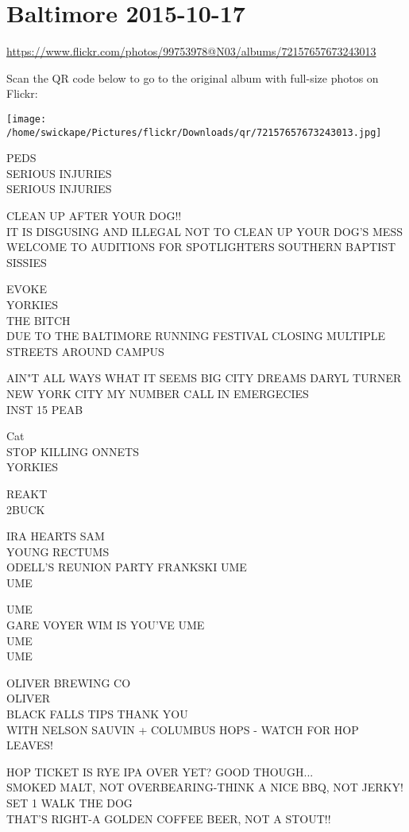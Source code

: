 \documentclass[10pt,letterpaper]{article}
\begin{document}
\section*{Baltimore 2015-10-17}

\url{https://www.flickr.com/photos/99753978@N03/albums/72157657673243013}

Scan the QR code below to go to the original album with full-size photos on Flickr:

\texttt{[image: /home/swickape/Pictures/flickr/Downloads/qr/72157657673243013.jpg]}


PEDS\\
SERIOUS INJURIES\\
SERIOUS INJURIES

CLEAN UP AFTER YOUR DOG!!\\
IT IS DISGUSING AND ILLEGAL NOT TO CLEAN UP YOUR DOG'S MESS\\
WELCOME TO AUDITIONS FOR SPOTLIGHTERS SOUTHERN BAPTIST SISSIES

EVOKE\\
YORKIES\\
THE BITCH\\
DUE TO THE BALTIMORE RUNNING FESTIVAL CLOSING MULTIPLE STREETS AROUND CAMPUS

AIN"T ALL WAYS WHAT IT SEEMS BIG CITY DREAMS DARYL TURNER NEW YORK CITY MY NUMBER CALL IN EMERGECIES\\
INST 15 PEAB

Cat\\
STOP KILLING ONNETS\\
YORKIES

REAKT\\
2BUCK

IRA HEARTS SAM\\
YOUNG RECTUMS\\
ODELL'S REUNION PARTY FRANKSKI UME\\
UME

UME\\
GARE VOYER WIM IS YOU'VE UME\\
UME\\
UME

OLIVER BREWING CO\\
OLIVER\\
BLACK FALLS TIPS THANK YOU\\
WITH NELSON SAUVIN + COLUMBUS HOPS {-} WATCH FOR HOP LEAVES!

HOP TICKET IS RYE IPA OVER YET?  GOOD THOUGH...\\
SMOKED MALT, NOT OVERBEARING{-}THINK A NICE BBQ, NOT JERKY!\\
SET 1 WALK THE DOG\\
THAT'S RIGHT{-}A GOLDEN COFFEE BEER, NOT A STOUT!!
\end{document}
